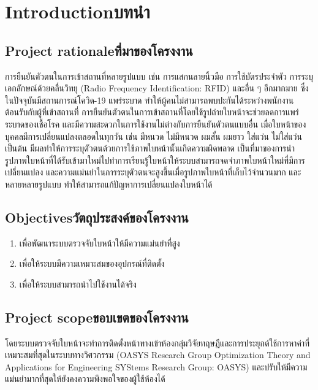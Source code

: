 \chapter{\ifenglish Introduction\else บทนำ\fi}

\section{\ifenglish Project rationale\else ที่มาของโครงงาน\fi}
การยืนยันตัวตนในการเข้าสถานที่หลายรูปแบบ เช่น การแสกนลายนิ้วมือ การใช้บัตรประจำตัว  การระบุเอกลักษณ์ด้วยคลื่นวิทยุ (Radio Frequency Identification: RFID) และอื่น ๆ อีกมากมาย 
ซึ่งในปัจจุบันมีสถานการณ์โควิด-19 แพร่ระบาด ทำให้ผู้คนไม่สามารถพบปะกันได้ระหว่างพนักงานต้อนรับกับผู้ที่เข้าสถานที่ 
การยืนยันตัวตนในการเข้าสถานที่โดยใช้รูปถ่ายใบหน้าจะช่วยลดการแพร่ระบาดของเชื้อโรค และมีความสะดวกในการใช้งานไม่ต่างกับการยืนยันตัวตนแบบอื่น 
เมื่อใบหน้าของบุคคลมีการเปลี่ยนแปลงตลอดในทุกวัน เช่น มีหนวด ไม่มีหนวด ผมสั้น ผมยาว ใส่แว่น ไม่ใส่แว่น เป็นต้น
มีผลทำให้การระบุตัวตนด้วยการใช้ภาพใบหน้านั้นเกิดความผิดพลาด เป็นที่มาของการนำรูปภาพใบหน้าที่ได้รับเข้ามาใหม่ไปทำการเรียนรู้ใบหน้าให้ระบบสามารถจดจำภาพใบหน้าใหม่ที่มีการเปลี่ยนแปลง 
และความแม่นยำในการระบุตัวตนจะสูงขึ้นเมื่อรูปภาพใบหน้าที่เก็บไว้จำนวนมาก และหลายหลายรูปแบบ ทำให้สามารถแก้ปัญหาการเปลี่ยนแปลงใบหน้าได้ 

\section{\ifenglish Objectives\else วัตถุประสงค์ของโครงงาน\fi}
\begin{enumerate}
    \item เพื่อพัฒนาระบบตรวจจับใบหน้าให้มีความแม่นยำที่สูง
    \item เพื่อให้ระบบมีความเหมาะสมของอุปกรณ์ที่ติดตั้ง
    \item เพื่อให้ระบบสามารถนำไปใช้งานได้จริง
\end{enumerate}

\section{\ifenglish Project scope\else ขอบเขตของโครงงาน\fi}
โดยระบบตรวจจับใบหน้าจะทำการติดตั้งหน้าทางเข้าห้องกลุ่มวิจัยทฤษฎีและการประยุกต์ใช้การหาค่าที่เหมาะสมที่สุดในระบบทางวิศวกรรม 
(OASYS Research Group Optimization Theory and Applications for Engineering SYStems Research Group: OASYS) 
และปรับให้มีความแม่นยำมากที่สุดให้ยังคงความพึงพอใจของผู้ใช้ห้องได้

